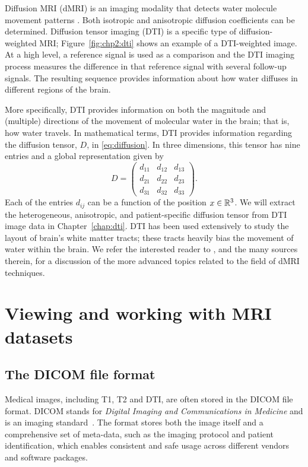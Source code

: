 %
%
Diffusion MRI (dMRI) is an imaging modality that detects water
molecule movement patterns \cite{jeurissen2017,soares2013hitchhiker}.
Both isotropic and anisotropic diffusion coefficients can be
determined. Diffusion tensor imaging (DTI) is a specific type of
diffusion-weighted MRI; Figure~\ref{fig:chp2:dti} shows an example of
a DTI-weighted image. At a high level, a reference signal is used as a
comparison and the DTI imaging process measures the difference in that
reference signal with several follow-up signals. The resulting
sequence provides information about how water diffuses in different
regions of the brain.

More specifically, DTI provides information on both the magnitude and 
(multiple) directions of the movement of molecular water in the brain; that is, 
how water travels. In mathematical terms, DTI provides information regarding 
the diffusion tensor, $D$, in \eqref{eq:diffusion}. In three dimensions, this 
tensor has nine entries and a global representation given by
\begin{equation}
D = \begin{pmatrix}
  d_{11} & d_{12} & d_{13} \\
  d_{21} & d_{22} & d_{23} \\
  d_{31} & d_{32} & d_{33}
\end{pmatrix}.
\end{equation}
Each of the entries $d_{ij}$ can be a function of the position $x \in
\mathbb{R}^3$. We will extract the heterogeneous, anisotropic,
and patient-specific diffusion tensor from DTI 
image data in Chapter~\ref{chap:dti}. DTI has been used extensively to 
study the layout of brain's white matter tracts; these tracts heavily bias 
the movement of water within the brain. We refer the interested reader to
\cite{jeurissen2017}, and the many sources therein, for a discussion
of the more advanced topics related to the field of dMRI techniques.

\section{Viewing and working with MRI datasets}
\label{sec:chp2:tools:viewers}

\subsection{The DICOM file format}

Medical images, including T1, T2 and DTI, are often stored in the
DICOM file format. DICOM stands for \emph{Digital Imaging and
  Communications in Medicine} and is an imaging
standard~\cite{mildenberger2002introduction}. The format stores both
the image itself and a comprehensive set of meta-data, such as
the imaging protocol and patient identification, which enables
consistent and safe usage across different vendors and software
packages. 

